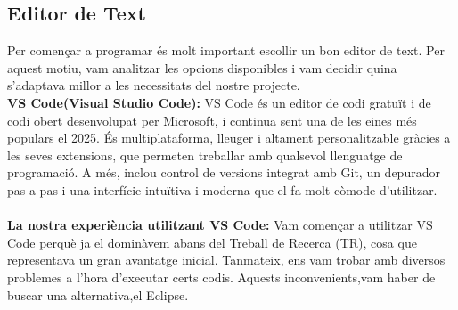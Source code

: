 \subsection{Editor de Text}
Per començar a programar és molt important escollir un bon editor de text. Per aquest motiu, vam analitzar les opcions disponibles i vam decidir quina s’adaptava millor a les necessitats del nostre projecte.\\

\textbf{VS Code(Visual Studio Code): }
VS Code és un editor de codi gratuït i de codi obert desenvolupat per Microsoft, i continua sent una de les eines més populars el 2025. És multiplataforma, lleuger i altament personalitzable gràcies a les seves extensions, que permeten treballar amb qualsevol llenguatge de programació. A més, inclou control de versions integrat amb Git, un depurador pas a pas i una interfície intuïtiva i moderna que el fa molt còmode d’utilitzar.\\ \\
\textbf{La nostra experiència utilitzant VS Code:}
Vam començar a utilitzar VS Code perquè ja el dominàvem abans del Treball de Recerca (TR), cosa que representava un gran avantatge inicial. Tanmateix, ens vam trobar amb diversos problemes a l'hora d'executar certs codis. Aquests inconvenients,vam haber de buscar una alternativa,el Eclipse. \\

